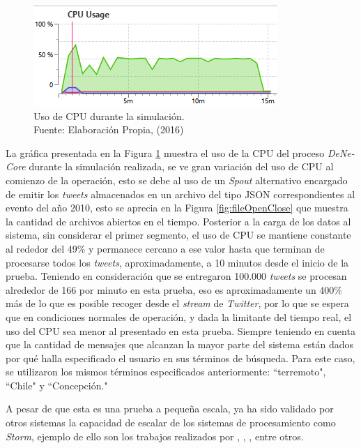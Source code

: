 \begin{figure}[H]
        \centering
        \captionsetup{justification=centering}
        \includegraphics[scale=1.2]{images/CPUUsageN.png}
        \caption[Uso de CPU durante la simulación.]{Uso de CPU durante la simulación.\\Fuente: Elaboración Propia, (2016)}
        \label{fig:cpuUsage}
\end{figure}

La gráfica presentada en la Figura \ref{fig:cpuUsage} muestra el uso de la CPU del proceso \textit{DeNe-Core} durante la simulación realizada, se ve gran variación del uso de CPU al comienzo de la operación, esto se debe al uso de un \textit{Spout} alternativo encargado de emitir los \textit{tweets} almacenados en un archivo del tipo JSON correspondientes al evento del año 2010, esto se aprecia en la Figura \ref{fig:fileOpenClose} que muestra la cantidad de archivos abiertos en el tiempo. Posterior a la carga de los datos al sistema, sin considerar el primer segmento, el uso de CPU se mantiene constante al rededor del 49\% y permanece cercano a ese valor hasta que terminan de procesarse todos los \textit{tweets}, aproximadamente, a 10 minutos desde el inicio de la prueba. Teniendo en consideración que se entregaron 100.000 \textit{tweets} se procesan alrededor de 166 por minuto en esta prueba, eso es aproximadamente un 400\% más de lo que es posible recoger desde el \textit{stream} de \textit{Twitter}, por lo que se espera que en condiciones normales de operación, y dada la limitante del tiempo real, el uso del CPU sea menor al presentado en esta prueba. Siempre teniendo en cuenta que la cantidad de mensajes que alcanzan la mayor parte del sistema están dados por qué halla especificado el usuario en sus términos de búsqueda. Para este caso, se utilizaron los mismos términos especificados anteriormente: ``terremoto", ``Chile" y ``Concepción."

A pesar de que esta es una prueba a pequeña escala, ya ha sido validado por otros sistemas la capacidad de escalar de los sistemas de procesamiento como \textit{Storm}, ejemplo de ello son los trabajos realizados por \cite{WladdimiroElastic}, \cite{scalingStorm}, \cite{HowSpotifyScalesStorm}, entre otros.

